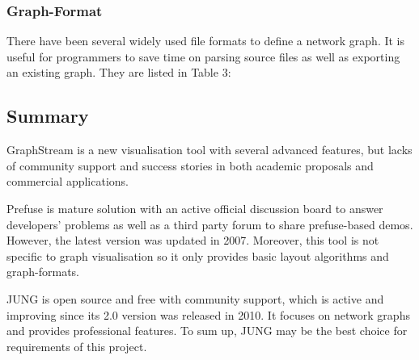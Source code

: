 \subsubsection{Graph-Format}
There have been several widely used file formats to define a network graph. It is useful for programmers to save time on parsing source files as well as exporting an existing graph. They are listed in Table 3:

\subsection{Summary}
GraphStream is a new visualisation tool with several advanced features, but lacks of community support and success stories in both academic proposals and commercial applications.

Prefuse is mature solution with an active official discussion board to answer developers’ problems as well as a third party forum  to share prefuse-based demos. However, the latest version was updated in 2007. Moreover, this tool is not specific to graph visualisation so it only provides basic layout algorithms and graph-formats.

JUNG is open source and free with community support, which is active and improving since its 2.0 version was released in 2010. It focuses on network graphs and provides professional features. To sum up, JUNG may be the best choice for requirements of this project.
